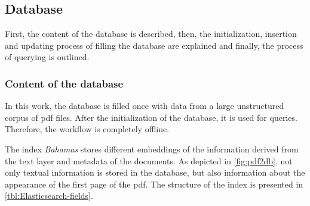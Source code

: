 \subsection{Database}\label{subsec:impl-db}
First, the content of the \databaseName{} database is described, then, the initialization, insertion and updating process of filling the database are explained 
and finally, the process of querying is outlined.

\subsubsection*{Content of the database}
In this work, the database is filled once with data from a large unstructured corpus of \ac{pdf} files.
After the initialization of the database, it is used for queries. 
Therefore, the workflow is completely offline.

The index \textit{Bahamas} stores different embeddings of the information derived from the text layer and metadata of the documents.
As depicted in \autoref{fig:pdf2db}, not only textual information is stored in the database, 
but also information about the appearance of the first page of the \ac{pdf}.
The structure of the index is presented in \autoref{tbl:Elasticsearch-fields}.

